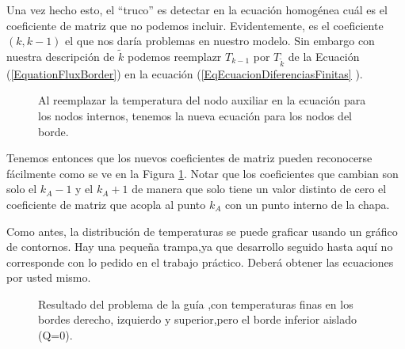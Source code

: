 
Una vez hecho esto, el ``truco''  es detectar en la ecuación homogénea cuál es
el coeficiente de matriz que no podemos incluir. Evidentemente, es el coeficiente
$(k,k-1)$ el que nos daría problemas en nuestro modelo. Sin embargo
con nuestra descripción de $\tilde{k}$ podemos reemplazr $T_{k-1}$ por 
$T_{\tilde{k}}$ de la Ecuación (\ref{EquationFluxBorder}) en la 
ecuación (\ref{EqEcuacionDiferenciasFinitas} ).

\begin{figure}
  \caption{\protect\label{FiguraCoeficientesMatrizFluxLeft} Al reemplazar
  la temperatura del nodo auxiliar en la ecuación para los nodos internos, 
  tenemos la nueva ecuación para los nodos del borde.} 
\end{figure}

Tenemos entonces que los nuevos coeficientes de matriz pueden reconocerse fácilmente
como se ve en la Figura \ref{FiguraCoeficientesMatrizFluxLeft}. Notar 
que los coeficientes que cambian son solo el $k_A - 1$ y el $k_A + 1$
de manera que solo tiene un valor distinto de cero el coeficiente de matriz que 
acopla al punto $k_A$ con un punto interno de la chapa. 

Como antes, la distribución de temperaturas se puede graficar usando 
un gráfico de contornos. Hay una pequeña trampa,ya que desarrollo 
seguido hasta aquí no corresponde con lo pedido en el trabajo práctico.
Deberá obtener las ecuaciones por usted mismo. 

\begin{figure}

  \caption{\protect\label{FigurePlotQ0}
  Resultado del problema de la guía ,con temperaturas finas en los bordes
  derecho, izquierdo y superior,pero el borde inferior aislado (Q=0).
  }
\end{figure}


